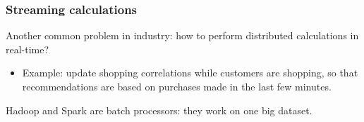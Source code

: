 \documentclass[compress]{beamer}
\begin{document}
\begin{frame}
\frametitle{Streaming calculations}

Another common problem in industry: how to perform distributed calculations in real-time?
\begin{itemize}
\item Example: update shopping correlations while customers are shopping, so that recommendations are based on purchases made in the last few minutes.
\end{itemize}

\vspace{0.2 cm}
Hadoop and Spark are batch processors: they work on one big dataset.

\vspace{0.2 cm}

\vspace{0.2 cm}

\vspace{-3.0 cm}
\end{frame}
\end{document}
